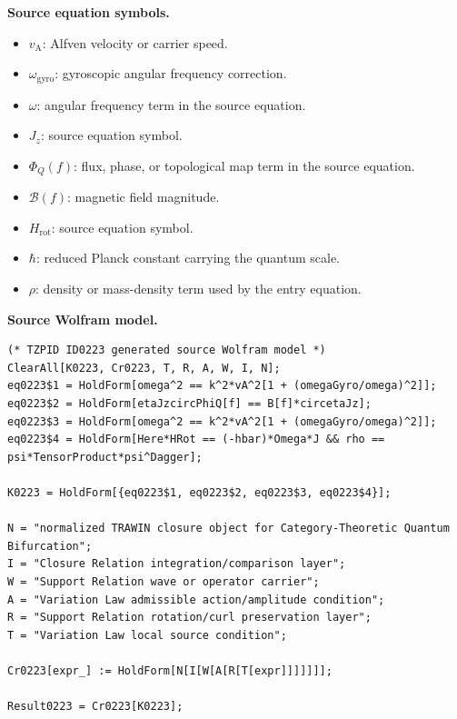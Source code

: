 \begin{minipage}[t]{0.49\linewidth}
\begingroup
\small
\raggedright
\textbf{Source equation symbols.}\par
\begin{itemize}[leftmargin=1.35em,itemsep=1pt,topsep=1pt,parsep=0pt]
    \item $v_{\mathrm{A}}$: Alfven velocity or carrier speed.
    \item $\omega_{\mathrm{gyro}}$: gyroscopic angular frequency correction.
    \item $\omega$: angular frequency term in the source equation.
    \item $J_z$: source equation symbol.
    \item $\Phi_Q(f)$: flux, phase, or topological map term in the source equation.
    \item $\mathcal{B}(f)$: magnetic field magnitude.
    \item $H_{\mathrm{rot}}$: source equation symbol.
    \item $\hbar$: reduced Planck constant carrying the quantum scale.
    \item $\rho$: density or mass-density term used by the entry equation.
\end{itemize}
\endgroup
\end{minipage}\hfill
\begin{minipage}[t]{0.47\linewidth}
\begingroup
\scriptsize
\raggedright
\textbf{Source Wolfram model.}\par
\begin{Verbatim}[fontsize=\tiny,breaklines=true,breakanywhere=true]
(* TZPID ID0223 generated source Wolfram model *)
ClearAll[K0223, Cr0223, T, R, A, W, I, N];
eq0223$1 = HoldForm[omega^2 == k^2*vA^2[1 + (omegaGyro/omega)^2]];
eq0223$2 = HoldForm[etaJzcircPhiQ[f] == B[f]*circetaJz];
eq0223$3 = HoldForm[omega^2 == k^2*vA^2[1 + (omegaGyro/omega)^2]];
eq0223$4 = HoldForm[Here*HRot == (-hbar)*Omega*J && rho == psi*TensorProduct*psi^Dagger];

K0223 = HoldForm[{eq0223$1, eq0223$2, eq0223$3, eq0223$4}];

N = "normalized TRAWIN closure object for Category-Theoretic Quantum Bifurcation";
I = "Closure Relation integration/comparison layer";
W = "Support Relation wave or operator carrier";
A = "Variation Law admissible action/amplitude condition";
R = "Support Relation rotation/curl preservation layer";
T = "Variation Law local source condition";

Cr0223[expr_] := HoldForm[N[I[W[A[R[T[expr]]]]]]];

Result0223 = Cr0223[K0223];
\end{Verbatim}
\endgroup
\end{minipage}


